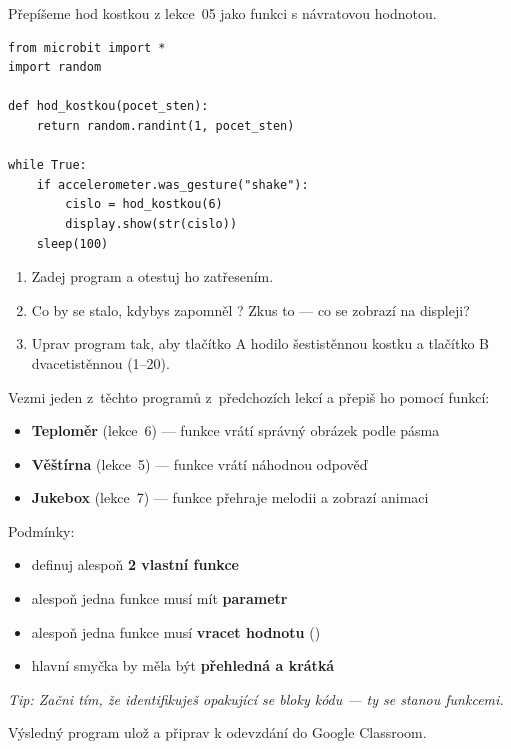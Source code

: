 \begin{ukol}

Přepíšeme hod kostkou z lekce~05 jako funkci s návratovou hodnotou.

\begin{lstlisting}
from microbit import *
import random

def hod_kostkou(pocet_sten):
    return random.randint(1, pocet_sten)

while True:
    if accelerometer.was_gesture("shake"):
        cislo = hod_kostkou(6)
        display.show(str(cislo))
    sleep(100)
\end{lstlisting}

\begin{enumerate}
  \item Zadej program a otestuj ho zatřesením.
  \item Co by se stalo, kdybys zapomněl ?
        Zkus to — co se zobrazí na displeji?
  \item Uprav program tak, aby tlačítko A hodilo šestistěnnou kostku
        a tlačítko B dvacetistěnnou (1--20).
\end{enumerate}

\odpoved[2cm]

\end{ukol}

\begin{ukol}[Refaktoring]

Vezmi jeden z~těchto programů z~předchozích lekcí a přepiš ho pomocí funkcí:

\begin{itemize}
  \item \textbf{Teploměr} (lekce~6) — funkce  vrátí
        správný obrázek podle pásma
  \item \textbf{Věštírna} (lekce~5) — funkce  vrátí náhodnou odpověď
  \item \textbf{Jukebox} (lekce~7) — funkce  přehraje melodii
        a zobrazí animaci
\end{itemize}

\medskip
Podmínky:
\begin{itemize}
  \item definuj alespoň \textbf{2 vlastní funkce}
  \item alespoň jedna funkce musí mít \textbf{parametr}
  \item alespoň jedna funkce musí \textbf{vracet hodnotu} ()
  \item hlavní smyčka  by měla být \textbf{přehledná a krátká}
\end{itemize}

\medskip
\textit{Tip: Začni tím, že identifikuješ opakující se bloky kódu — ty se stanou funkcemi.}

\odpoved[6cm]

\noindent Výsledný program ulož a připrav k odevzdání do Google Classroom.

\end{ukol}


